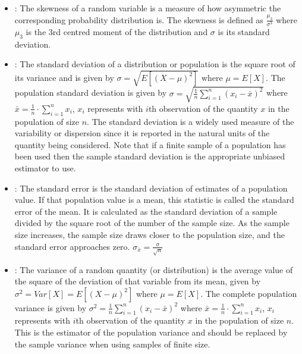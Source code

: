 \documentclass[draftspec]{sbmlpkgspec}
\begin{document}
\begin{itemize}
\item {}:  The skewness of a random variable is a measure of how asymmetric the corresponding probability distribution is. The skewness is defined as $  \frac{\mu_3}{\sigma^3} $ where $ \mu_3 $ is the 3rd centred moment of the distribution and $ \sigma $ is its standard deviation.

\item {}:  The standard deviation of a distribution or population is the square root of its variance and is given by $ \sigma = \sqrt{E[(X - \mu)^2]} $ where $ \mu = E[X] $. The population standard deviation is given by $ \sigma = \sqrt{\frac{1}{n} \sum_{i=1}^n\left(x_i - \bar{x} \right)^2} $ where $ \bar{x} = \frac{1}{n}\cdot \sum_{i=1}^n{x_i} $, $ x_i $ represents with $ i $th observation of the quantity $ x $ in the population of size $ n $. The standard deviation is a widely used measure of the variability or dispersion since it is reported in the natural units of the quantity being considered. Note that if a finite sample of a population has been used then the sample standard deviation is the appropriate unbiased estimator to use.

\item {}:  The standard error is the standard deviation of estimates of a population value. If that population value is a mean, this statistic is called the standard error of the mean.  It is calculated as the standard deviation of a sample divided by the square root of the number of the sample size.  As the sample size increases, the sample size draws closer to the population size, and the standard error approaches zero.  $ \sigma_{\bar{x}} = \frac{\sigma}{\sqrt{n}} $

\item {}:  The variance of a random quantity (or distribution) is the average value of the square of the deviation of that variable from its mean, given by $ \sigma^2 = Var[X] = E[(X - \mu)^2] $ where $ \mu = E[X] $. The complete population variance is given by $ \sigma^2 = \frac{1}{n} \sum_{i=1}^n\left(x_i - \bar{x} \right)^2 $ where $ \bar{x} = \frac{1}{n}\cdot \sum_{i=1}^n{x_i} $, $ x_i $ represents with $ i $th observation of the quantity $ x $ in the population of size $ n $. This is the estimator of the population variance and should be replaced by the sample variance when using samples of finite size.


\end{itemize}
\end{document}
